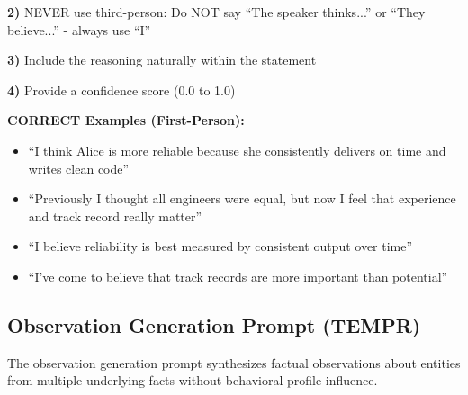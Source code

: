 \begin{tcolorbox}
\textbf{2)} NEVER use third-person: Do NOT say ``The speaker thinks...'' or ``They believe...'' - always use ``I''

\textbf{3)} Include the reasoning naturally within the statement

\textbf{4)} Provide a confidence score (0.0 to 1.0)

\vspace{0.2cm}

\textbf{CORRECT Examples (First-Person):}
\begin{itemize}
    \item ``I think Alice is more reliable because she consistently delivers on time and writes clean code''
    \item ``Previously I thought all engineers were equal, but now I feel that experience and track record really matter''
    \item ``I believe reliability is best measured by consistent output over time''
    \item ``I've come to believe that track records are more important than potential''
\end{itemize}
\end{tcolorbox}

\subsection{Observation Generation Prompt (TEMPR)}
\label{sec:appendix-observation-generation}

The observation generation prompt synthesizes factual observations about entities from multiple underlying facts without behavioral profile influence.

